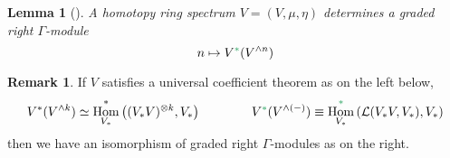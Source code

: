 \documentclass[11pt,reqno
,draft
]{amsart}
\numberwithin{equation}{section}
\numberwithin{figure}{section}
\newtheorem{lemma}[equation]{Lemma}%
\newtheorem{claim}[equation]{Claim}%
\theoremstyle{definition} %
\newtheorem{remark}[equation]{Remark}%
\DeclareMathOperator{\Hom}{Hom}%
\newcommand{\Ksi}{\Xi}
\newcommand{\Loday}{\mathcal L}
\newcommand{\greenstar}{{\color{ForestGreen}\**}}
\DeclareMathOperator{\Tot}{Tot}
\begin{document}

\begin{lemma}[{\cite[\S 4.9]{Rob18}}]
        A homotopy ring spectrum $V = (V, \mu, \eta)$ determines a graded right $\Gamma$-module
        \[
                n \mapsto V^{\greenstar}(V^{\wedge n}) %
        \]
\end{lemma}

\begin{remark}
        \label{UCT_REM}
        If $V$ satisfies a universal coefficient theorem as on the left below,
        \begin{equation}
                \label{UCT_EQ}
                V^{\**}(V^{\wedge k}) \simeq \Hom^{\**}_{V_{\**}}\left( (V_{\**}V)^{\otimes k}, V_{\**} \right)
                \qquad \qquad
                V^{\greenstar}(V^{\wedge (-)}) \equiv %
                \Hom_{V_{\**}}^{\greenstar}\left( \Loday(V_{\**}V, V_{\**}), V_{\**} \right)
        \end{equation}
        then we have an isomorphism of graded right $\Gamma$-modules as on the right.
\end{remark}
\end{document}
